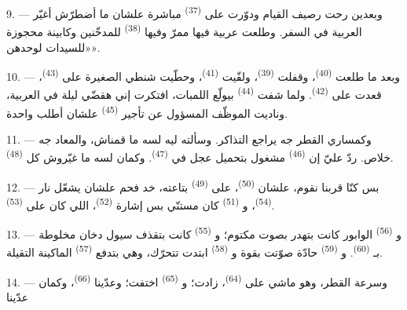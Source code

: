 9. --- وبعدين رحت رصيف القيام ودوّرت على  \textsuperscript{(37)} مباشرة
علشان ما أضطرّش أغيّر العربية في السفر. وطلعت عربية فيها ممرّ وفيها
 \textsuperscript{(38)} للمدخّنين وكابينة محجوزة «للسيدات لوحدهن».

\VUsaut{3.0mm}

10. --- وبعد ما طلعت  \textsuperscript{(40)}، وقفلت 
\textsuperscript{(39)}، ولفّيت  \textsuperscript{(41)}، وحطّيت شنطي
الصغيرة على  \textsuperscript{(43)}، قعدت على 
\textsuperscript{(42)}. ولما شفت  \textsuperscript{(44)} بيولّع
اللمبات، افتكرت إني هقضّي ليلة في العربية، وناديت الموظّف المسؤول عن تأجير
 \textsuperscript{(45)} علشان أطلب واحدة.

11. --- وكمساري القطر جه يراجع التذاكر. وسألته ليه لسه ما قمناش، والمعاد جه
خلاص. ردّ عليّ إن  \textsuperscript{(46)} مشغول بتحميل عجل في
 \textsuperscript{(47)}. وكمان لسه ما غيّروش كل
 \textsuperscript{(48)}.

12. --- بس كنّا قربنا نقوم، علشان  \textsuperscript{(50)}، على
 \textsuperscript{(49)} بتاعته، خد فحم علشان يشعّل نار
 \textsuperscript{(54)}، و \textsuperscript{(51)} كان
مستنّي بس إشارة  \textsuperscript{(52)}، اللي كان على
 \textsuperscript{(53)}.

13. --- و \textsuperscript{(56)} الوابور كانت بتهدر بصوت مكتوم؛
و \textsuperscript{(55)} كانت بتقذف سيول دخان مخلوطة
بـ \textsuperscript{(60)}. و \textsuperscript{(59)} حادّة
صوّتت بقوة و \textsuperscript{(58)} ابتدت تتحرّك، وهي بتدفع
 \textsuperscript{(57)} الماكينة التقيلة.

\VUsaut{3.0mm}
\VUsaut{3.0mm}

14. --- وسرعة القطر، وهو ماشي على  \textsuperscript{(64)}، زادت؛
و \textsuperscript{(65)} اختفت؛ وعدّينا 
\textsuperscript{(66)}، وكمان عدّينا


